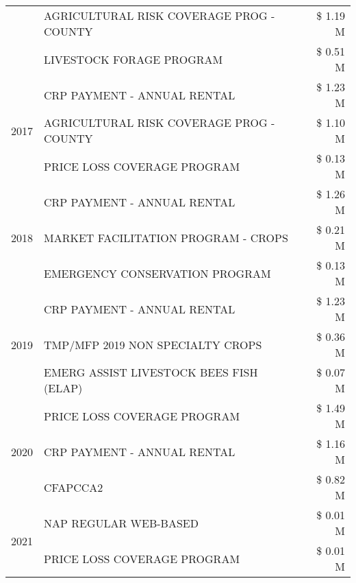\begin{tabular}{llr}
 & AGRICULTURAL RISK COVERAGE PROG - COUNTY & \$ 1.19 M \\
 & LIVESTOCK FORAGE PROGRAM & \$ 0.51 M \\
\cline{1-3}
\multirow[t]{3}{*}{2017} & CRP PAYMENT - ANNUAL RENTAL & \$ 1.23 M \\
 & AGRICULTURAL RISK COVERAGE PROG - COUNTY & \$ 1.10 M \\
 & PRICE LOSS COVERAGE PROGRAM & \$ 0.13 M \\
\cline{1-3}
\multirow[t]{3}{*}{2018} & CRP PAYMENT - ANNUAL RENTAL & \$ 1.26 M \\
 & MARKET FACILITATION PROGRAM - CROPS & \$ 0.21 M \\
 & EMERGENCY CONSERVATION PROGRAM & \$ 0.13 M \\
\cline{1-3}
\multirow[t]{3}{*}{2019} & CRP PAYMENT - ANNUAL RENTAL & \$ 1.23 M \\
 & TMP/MFP 2019 NON SPECIALTY CROPS & \$ 0.36 M \\
 & EMERG ASSIST LIVESTOCK BEES FISH (ELAP) & \$ 0.07 M \\
\cline{1-3}
\multirow[t]{3}{*}{2020} & PRICE LOSS COVERAGE PROGRAM & \$ 1.49 M \\
 & CRP PAYMENT - ANNUAL RENTAL & \$ 1.16 M \\
 & CFAPCCA2 & \$ 0.82 M \\
\cline{1-3}
\multirow[t]{2}{*}{2021} & NAP REGULAR WEB-BASED & \$ 0.01 M \\
 & PRICE LOSS COVERAGE PROGRAM & \$ 0.01 M \\
\cline{1-3}
\bottomrule
\end{tabular}
